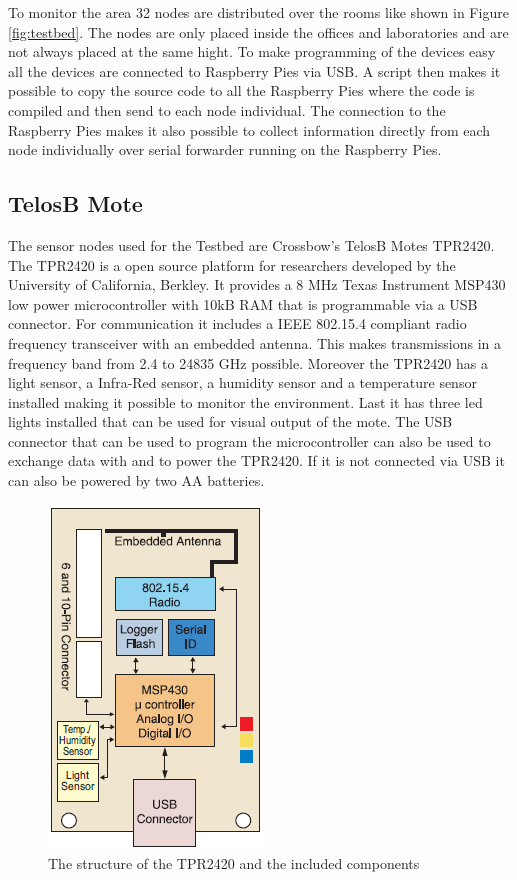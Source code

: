 To monitor the area 32 nodes are distributed over the rooms like shown in Figure \ref{fig:testbed}. The nodes are only placed inside the offices and laboratories and are not always placed at the same hight. To make programming of the devices easy all the devices are connected to Raspberry Pies via USB. A script then makes it possible to copy the source code to all the Raspberry Pies where the code is compiled and then send to each node individual. The connection to the Raspberry Pies makes it also possible to collect information directly from each node individually over serial forwarder running on the Raspberry Pies.

\subsection{TelosB Mote}
The sensor nodes used for the Testbed are Crossbow's TelosB Motes TPR2420. The TPR2420 is a open source platform for researchers developed by the University of California, Berkley. It provides a 8 MHz Texas Instrument MSP430 low power microcontroller with 10kB RAM that is programmable via a USB connector. For communication it includes a IEEE 802.15.4 compliant radio frequency transceiver with an embedded antenna. This makes transmissions in a frequency band from 2.4 to 24835 GHz possible. Moreover the TPR2420 has a light sensor, a Infra-Red sensor, a humidity sensor and a temperature sensor installed making it possible to monitor the environment. Last it has three led lights installed that can be used for visual output of the mote. The USB connector that can be used to program the microcontroller can also be used to exchange data with and to power the TPR2420. If it is not connected via USB it can also be powered by two AA batteries. \cite{telosb}

\begin{figure}[htbp]
	\centering
    \includegraphics[scale=0.7]{content/images/Mote1}
   	\caption{The structure of the TPR2420 and the included components \cite{telosb}}
    \label{fig:telosb}
\end{figure}
 
